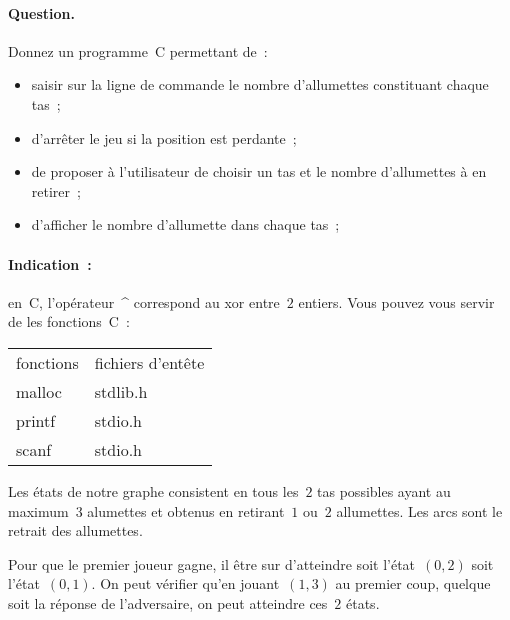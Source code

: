   \paragraph{Question.}
  Donnez un programme~C permettant de~:
  \begin{itemize}
  \item saisir sur la ligne de commande le nombre d'allumettes
    constituant chaque tas~;
  \item d'arr\^eter le jeu si la position est perdante~;
  \item de proposer \`a l'utilisateur de choisir un tas et le nombre
    d'allumettes \`a en retirer~;
  \item d'afficher le nombre d'allumette dans chaque tas~;
  \end{itemize}

  \paragraph{Indication~:} en~C, l'op\'erateur~\^{} correspond au xor
  entre~$2$ entiers. Vous pouvez vous servir de les fonctions~C~:
  \begin{center}
    \begin{tabular}{ll}
      fonctions & fichiers d'ent\^ete \\
      malloc & stdlib.h \\
      printf & stdio.h \\
      scanf & stdio.h
    \end{tabular}
  \end{center}
\ifcorrection%
\begin{correction}
  Les \'etats de notre graphe consistent en tous les~$2$ tas possibles
  ayant au maximum~$3$ alumettes et obtenus en retirant~$1$ ou~$2$
  allumettes. Les arcs sont le retrait des allumettes.
  \par
  Pour que le premier joueur gagne, il \^etre sur d'atteindre soit
  l'\'etat~$(0,2)$ soit l'\'etat~$(0,1)$.  On peut v\'erifier qu'en
  jouant~$(1,3)$ au premier coup, quelque soit la r\'eponse de
  l'adversaire, on peut atteindre ces~$2$ \'etats.
\end{correction}
\fi%
